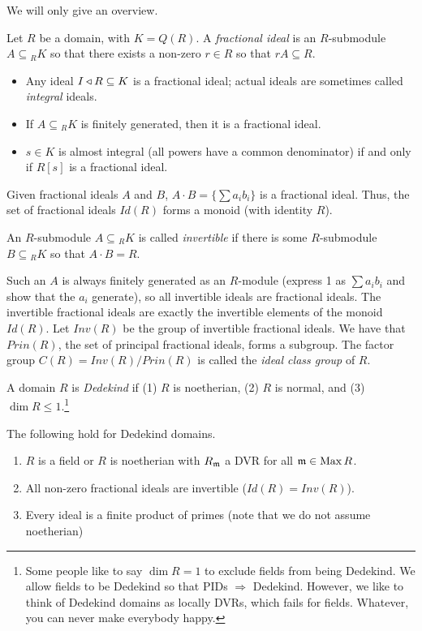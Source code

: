  We will only give an overview.

 Let $R$ be a domain, with $K=Q(R)$. A \emph{fractional ideal} is an $R$-submodule
 $A\subseteq {}_R K$ so that there exists a non-zero $r\in R$ so that $rA\subseteq R$.
 \begin{example}
   \begin{itemize}
   \item Any ideal $I\triangleleft R\subseteq K$ is a fractional ideal; actual ideals are
   sometimes called \emph{integral} ideals.

   \item If $A\subseteq {}_R K$ is finitely generated, then it is a fractional ideal.

   \item $s\in K$ is almost integral (all powers have a common denominator) if and only
   if $R[s]$ is a fractional ideal.
   \end{itemize}
   \vspace*{-1.7\baselineskip}
 \end{example}
 Given fractional ideals $A$ and $B$, $A\cdot B=\{\sum a_ib_i\}$ is a fractional ideal.
 Thus, the set of fractional ideals $Id(R)$ forms a monoid (with identity $R$).
 \begin{definition}
   An $R$-submodule $A\subseteq {}_RK$ is called \emph{invertible} if there is some
   $R$-submodule $B\subseteq {}_RK$ so that $A\cdot B=R$.
 \end{definition}
 Such an $A$ is always finitely generated as an $R$-module (express 1 as $\sum a_ib_i$
 and show that the $a_i$ generate), so all invertible ideals are fractional ideals. The
 invertible fractional ideals are exactly the invertible elements of the monoid $Id(R)$.
 Let $Inv(R)$ be the group of invertible fractional ideals. We have that $Prin(R)$, the
 set of principal fractional ideals, forms a subgroup. The factor group
 $C(R)=Inv(R)/Prin(R)$ is called the \emph{ideal class group} of $R$.

 \begin{definition}
   A domain $R$ is \emph{Dedekind} if (1) $R$ is noetherian, (2) $R$ is normal, and (3)
   $\dim R\le 1$.\footnote{Some people like to say $\dim R=1$ to exclude fields from
   being Dedekind. We allow fields to be Dedekind so that PIDs $\Rightarrow$ Dedekind.
   However, we like to think of Dedekind domains as locally DVRs, which fails for fields.
   Whatever, you can never make everybody happy.}
 \end{definition}
 The following hold for Dedekind domains.
 \begin{enumerate}
   \item $R$ is a field or $R$ is noetherian with $R_{\mathfrak{m}}$ a DVR for all $\mathfrak{m}\in \operatorname{Max} R$.
   \item All non-zero fractional ideals are invertible ($Id(R)=Inv(R)$).
   \item Every ideal is a finite product of primes (note that we do not assume
   noetherian)
 \end{enumerate}
